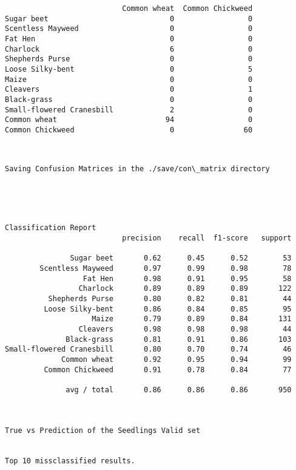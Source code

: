 \documentclass[11pt]{article}
\begin{document}
\begin{verbatim}
                           Common wheat  Common Chickweed  
Sugar beet                            0                 0  
Scentless Mayweed                     0                 0  
Fat Hen                               0                 0  
Charlock                              6                 0  
Shepherds Purse                       0                 0  
Loose Silky-bent                      0                 5  
Maize                                 0                 0  
Cleavers                              0                 1  
Black-grass                           0                 0  
Small-flowered Cranesbill             2                 0  
Common wheat                         94                 0  
Common Chickweed                      0                60  
    \end{verbatim}

    
    \begin{Verbatim}[commandchars=\\\{\}]


Saving Confusion Matrices in the ./save/con\_matrix directory

    \end{Verbatim}

    \begin{center}
    \end{center}
    { \hspace*{\fill} \\}
    
    \begin{Verbatim}[commandchars=\\\{\}]


Classification Report
                           precision    recall  f1-score   support

               Sugar beet       0.62      0.45      0.52        53
        Scentless Mayweed       0.97      0.99      0.98        78
                  Fat Hen       0.98      0.91      0.95        58
                 Charlock       0.89      0.89      0.89       122
          Shepherds Purse       0.80      0.82      0.81        44
         Loose Silky-bent       0.86      0.84      0.85        95
                    Maize       0.79      0.89      0.84       131
                 Cleavers       0.98      0.98      0.98        44
              Black-grass       0.81      0.91      0.86       103
Small-flowered Cranesbill       0.80      0.70      0.74        46
             Common wheat       0.92      0.95      0.94        99
         Common Chickweed       0.91      0.78      0.84        77

              avg / total       0.86      0.86      0.86       950



True vs Prediction of the Seedlings Valid set


Top 10 missclassified results.

    \end{Verbatim}
\end{document}
